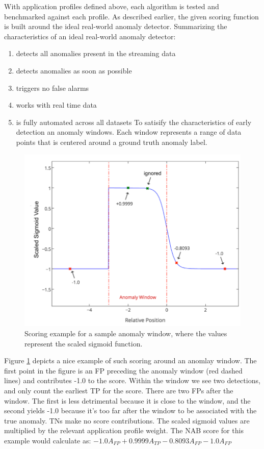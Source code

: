 \documentclass[12pt]{article}
\begin{document}
With application profiles defined above, each algorithm is tested and benchmarked against each profile. As described earlier, the given scoring function is built around the ideal real-world anomaly detector. Summarizing the characteristics of an ideal real-world anomaly detector:
\begin{enumerate}
\item detects all anomalies present in the streaming data
\item detects anomalies as soon as possible
\item triggers no false alarms 
\item works with real time data
\item is fully automated across all datasets 
To satisify the characteristics of early detection an anomaly
windows. Each window represents a range of data points that is
centered around a ground truth anomaly label.
\end{enumerate} 
\begin{figure}[H]
\centering
        \includegraphics[width=\textwidth]{images/nabScoringExample.png}
    \caption{Scoring example for a sample anomaly window, where the values
represent the scaled sigmoid function. }
    \label{nabSigmoidScoringFunction}
\end{figure}
Figure \ref{nabSigmoidScoringFunction} depicts a nice example of such scoring around an anomlay window. The first point in the figure is an FP preceding the anomaly window (red dashed lines) and contributes -1.0 to the score. Within the window we see two detections, and
only count the earliest TP for the score. There are two FPs after the window. The first is less detrimental because it is close to the window, and the second yields -1.0 because it’s too far after the window to be associated with the true anomaly. TNs make no score contributions. The scaled sigmoid values are multiplied by the relevant application profile weight. The NAB score for this example would calculate as: $-1.0A_{FP} + 0.9999A_{TP} - 0.8093A_{FP} - 1.0A_{FP} $ \\
\end{document}
